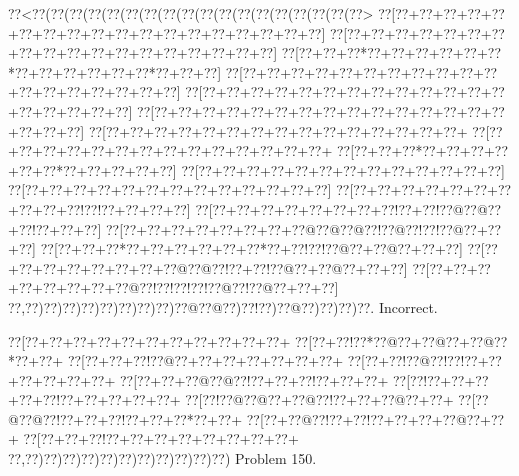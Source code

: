 \documentclass[a5paper]{article}
\begin{document}
\begin{center}
{\goo
\0??<\0??(\0??(\0??(\0??(\0??(\0??(\0??(\0??(\0??(\0??(\0??(\0??(\0??(\0??(\0??(\0??(\0??(\0??>
\0??[\0??+\0??+\0??+\0??+\0??+\0??+\0??+\0??+\0??+\0??+\0??+\0??+\0??+\0??+\0??+\0??+\0??+\0??]
\0??[\0??+\0??+\0??+\0??+\0??+\0??+\0??+\0??+\0??+\0??+\0??+\0??+\0??+\0??+\0??+\0??+\0??+\0??]
\0??[\0??+\0??+\0??*\0??+\0??+\0??+\0??+\0??+\0??*\0??+\0??+\0??+\0??+\0??+\0??*\0??+\0??+\0??]
\0??[\0??+\0??+\0??+\0??+\0??+\0??+\0??+\0??+\0??+\0??+\0??+\0??+\0??+\0??+\0??+\0??+\0??+\0??]
\0??[\0??+\0??+\0??+\0??+\0??+\0??+\0??+\0??+\0??+\0??+\0??+\0??+\0??+\0??+\0??+\0??+\0??+\0??]
\0??[\0??+\0??+\0??+\0??+\0??+\0??+\0??+\0??+\0??+\0??+\0??+\0??+\0??+\0??+\0??+\0??+\0??+\0??]
\0??[\0??+\0??+\0??+\0??+\0??+\0??+\0??+\0??+\0??+\0??+\0??+\0??+\0??+\0??+\0??+
\0??[\0??+\0??+\0??+\0??+\0??+\0??+\0??+\0??+\0??+\0??+\0??+\0??+\0??+\0??+
\0??[\0??+\0??+\0??*\0??+\0??+\0??+\0??+\0??+\0??*\0??+\0??+\0??+\0??+\0??]
\0??[\0??+\0??+\0??+\0??+\0??+\0??+\0??+\0??+\0??+\0??+\0??+\0??+\0??]
\0??[\0??+\0??+\0??+\0??+\0??+\0??+\0??+\0??+\0??+\0??+\0??+\0??+\0??]
\0??[\0??+\0??+\0??+\0??+\0??+\0??+\0??+\0??+\0??+\0??!\0??!\0??+\0??+\0??+\0??]
\0??[\0??+\0??+\0??+\0??+\0??+\0??+\0??+\0??!\0??+\0??!\0??@\0??@\0??+\0??!\0??+\0??+\0??]
\0??[\0??+\0??+\0??+\0??+\0??+\0??+\0??+\0??@\0??@\0??@\0??!\0??@\0??!\0??!\0??@\0??+\0??+\0??]
\0??[\0??+\0??+\0??*\0??+\0??+\0??+\0??+\0??+\0??*\0??+\0??!\0??!\0??@\0??+\0??@\0??+\0??+\0??]
\0??[\0??+\0??+\0??+\0??+\0??+\0??+\0??+\0??@\0??@\0??!\0??+\0??!\0??@\0??+\0??@\0??+\0??+\0??]
\0??[\0??+\0??+\0??+\0??+\0??+\0??+\0??+\0??@\0??!\0??!\0??!\0??!\0??@\0??!\0??@\0??+\0??+\0??]
\0??,\0??)\0??)\0??)\0??)\0??)\0??)\0??)\0??)\0??@\0??@\0??)\0??!\0??)\0??@\0??)\0??)\0??)\0??.
}
Incorrect. 

\end{center}
\newpage
\begin{center}
{\goo
\0??[\0??+\0??+\0??+\0??+\0??+\0??+\0??+\0??+\0??+\0??+\0??+
\0??[\0??+\0??!\0??*\0??@\0??+\0??@\0??+\0??@\0??*\0??+\0??+
\0??[\0??+\0??+\0??!\0??@\0??+\0??+\0??+\0??+\0??+\0??+\0??+
\0??[\0??+\0??!\0??@\0??!\0??!\0??+\0??+\0??+\0??+\0??+\0??+
\0??[\0??+\0??+\0??@\0??@\0??!\0??+\0??+\0??!\0??+\0??+\0??+
\0??[\0??!\0??+\0??+\0??+\0??+\0??!\0??+\0??+\0??+\0??+\0??+
\0??[\0??!\0??@\0??@\0??+\0??@\0??!\0??+\0??+\0??@\0??+\0??+
\0??[\0??@\0??@\0??!\0??+\0??+\0??!\0??+\0??+\0??*\0??+\0??+
\0??[\0??+\0??@\0??!\0??+\0??!\0??+\0??+\0??+\0??@\0??+\0??+
\0??[\0??+\0??+\0??!\0??+\0??+\0??+\0??+\0??+\0??+\0??+\0??+
\0??,\0??)\0??)\0??)\0??)\0??)\0??)\0??)\0??)\0??)\0??)\0??)
}
Problem 150.

\end{center}
\end{document}
